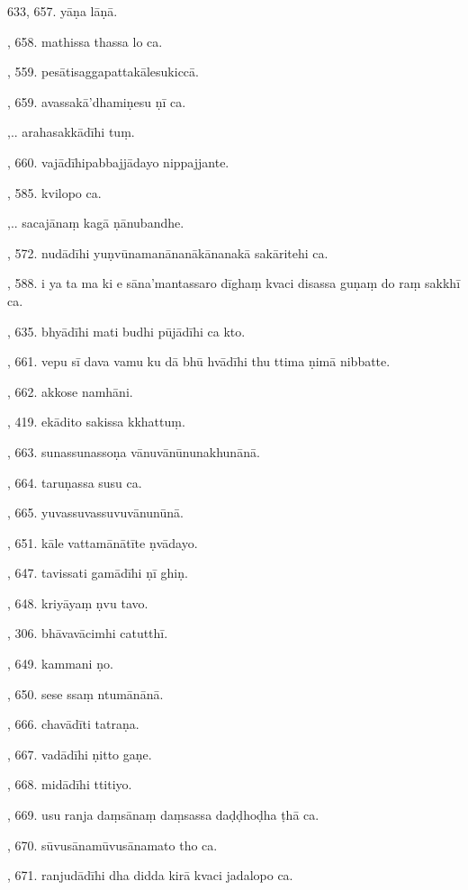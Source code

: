 633, 657. yāṇa lāṇā.\par {}, 658. mathissa thassa lo ca.\par {}, 559. pesātisaggapattakālesukiccā.\par {}, 659. avassakā’dhamiṇesu ṇī ca.\par {},.. arahasakkādīhi tuṃ.\par {}, 660. vajādīhipabbajjādayo nippajjante.\par {}, 585. kvilopo ca.\par {},.. sacajānaṃ kagā ṇānubandhe.\par {}, 572. nudādīhi yuṇvūnamanānanākānanakā sakāritehi ca.\par {}, 588. i ya ta ma ki e sāna’mantassaro dīghaṃ kvaci disassa guṇaṃ do raṃ sakkhī ca.\par {}, 635. bhyādīhi mati budhi pūjādīhi ca kto.\par {}, 661. vepu sī dava vamu ku dā bhū hvādīhi thu ttima ṇimā nibbatte.\par {}, 662. akkose namhāni.\par {}, 419. ekādito sakissa kkhattuṃ.\par {}, 663. sunassunassoṇa vānuvānūnunakhunānā.\par {}, 664. taruṇassa susu ca.\par {}, 665. yuvassuvassuvuvānunūnā.\par {}, 651. kāle vattamānātīte ṇvādayo.\par {}, 647. tavissati gamādīhi ṇī ghiṇ.\par {}, 648. kriyāyaṃ ṇvu tavo.\par {}, 306. bhāvavācimhi catutthī.\par {}, 649. kammani ṇo.\par {}, 650. sese ssaṃ ntumānānā.\par {}, 666. chavādīti tatraṇa.\par {}, 667. vadādīhi ṇitto gaṇe.\par {}, 668. midādīhi ttitiyo.\par {}, 669. usu ranja daṃsānaṃ daṃsassa daḍḍhoḍha ṭhā ca.\par {}, 670. sūvusānamūvusānamato tho ca.\par {}, 671. ranjudādīhi dha didda kirā kvaci jadalopo ca.\par \noindent
